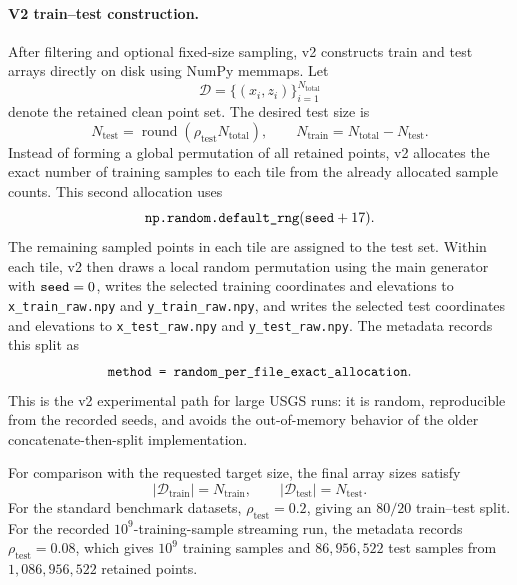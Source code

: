 \paragraph{V2 train--test construction.}
After filtering and optional fixed-size sampling, v2 constructs train and test
arrays directly on disk using NumPy memmaps.  Let
\[
\mathcal{D}=\{(x_i,z_i)\}_{i=1}^{N_{\mathrm{total}}}
\]
denote the retained clean point set.  The desired test size is
\[
N_{\mathrm{test}}
=
\operatorname{round}(\rho_{\mathrm{test}}N_{\mathrm{total}}),
\qquad
N_{\mathrm{train}}=N_{\mathrm{total}}-N_{\mathrm{test}}.
\]
Instead of forming a global permutation of all retained points, v2 allocates the
exact number of training samples to each tile from the already allocated sample
counts.  This second allocation uses
\[
\text{\texttt{np.random.default\_rng}}(\text{\texttt{seed}}+17).
\]
The remaining sampled points in each tile are assigned to the test set.  Within
each tile, v2 then draws a local random permutation using the main generator
with \(\text{\texttt{seed}}=0\), writes the selected training coordinates and
elevations to \texttt{x\_train\_raw.npy} and \texttt{y\_train\_raw.npy}, and
writes the selected test coordinates and elevations to
\texttt{x\_test\_raw.npy} and \texttt{y\_test\_raw.npy}.  The metadata records
this split as
\[
\text{\texttt{method = random\_per\_file\_exact\_allocation}}.
\]
This is the v2 experimental path for large USGS runs: it is random,
reproducible from the recorded seeds, and avoids the out-of-memory behavior of
the older concatenate-then-split implementation.

For comparison with the requested target size, the final array sizes satisfy
\[
|\mathcal{D}_{\mathrm{train}}|=N_{\mathrm{train}},
\qquad
|\mathcal{D}_{\mathrm{test}}|=N_{\mathrm{test}}.
\]
For the standard benchmark datasets, \(\rho_{\mathrm{test}}=0.2\), giving an
\(80/20\) train--test split.  For the recorded \(10^9\)-training-sample
streaming run, the metadata records \(\rho_{\mathrm{test}}=0.08\), which gives
\(10^9\) training samples and \(86{,}956{,}522\) test samples from
\(1{,}086{,}956{,}522\) retained points.

